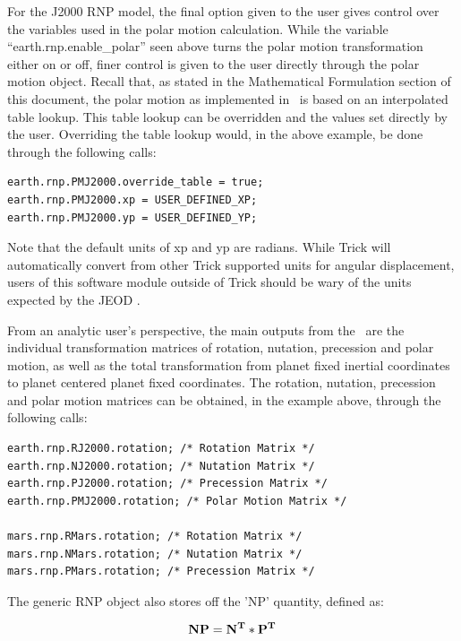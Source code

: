 For the J2000 RNP model, the final option given to the user gives control
over the variables used in the polar motion calculation. While the variable
``earth.rnp.enable\_polar'' seen above turns the polar motion transformation
either on or off, finer control is given to the user directly through the polar
motion object. Recall that, as stated in the Mathematical Formulation section
of this document, the polar motion as implemented in \JEODid\ is based on an
interpolated table lookup. This table lookup can be overridden and the values
set directly by the user. Overriding the table lookup would, in the above
example, be done through the following calls:

\begin{verbatim}
earth.rnp.PMJ2000.override_table = true;
earth.rnp.PMJ2000.xp = USER_DEFINED_XP;
earth.rnp.PMJ2000.yp = USER_DEFINED_YP;
\end{verbatim}

Note that the default units of xp and yp are radians. While Trick will
automatically convert from other Trick supported units for angular displacement,
users of this software module outside of Trick should be wary of the units
expected by the JEOD \ModelDesc.

From an analytic user's perspective, the main outputs from the \ModelDesc\ are
the individual transformation matrices of rotation, nutation, precession and
polar motion, as well as the total transformation from planet fixed inertial
coordinates to planet centered planet fixed coordinates.
The rotation, nutation, precession and polar motion matrices can be obtained,
in the example above, through the following calls:

\begin{verbatim}
earth.rnp.RJ2000.rotation; /* Rotation Matrix */
earth.rnp.NJ2000.rotation; /* Nutation Matrix */
earth.rnp.PJ2000.rotation; /* Precession Matrix */
earth.rnp.PMJ2000.rotation; /* Polar Motion Matrix */

mars.rnp.RMars.rotation; /* Rotation Matrix */
mars.rnp.NMars.rotation; /* Nutation Matrix */
mars.rnp.PMars.rotation; /* Precession Matrix */
\end{verbatim}                     

The generic RNP object also stores off the 'NP' quantity, defined as:

\begin{equation}\label{np_definition} 
{\bf NP} = {\bf N^T} * {\bf P^T}
\end{equation}


